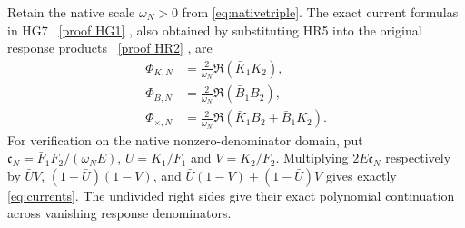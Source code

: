 \documentclass[11pt]{article}
\begin{document}
Retain the native scale $\omega_N>0$ from \eqref{eq:nativetriple}.
The exact current formulas in HG7 \cite{HG}%
~\href{https://github.com/KokunoYumeto/zeta-function-research-reader/blob/5992ad50c0f2a06921f1fcaded7b4e38097c0739/workbenches/splitzero-tandem/continuations/20260920-original-kernel-mixed-determinants/providers/HEAT_GROWTH_AND_ORIGINAL_CURRENTS.tex\#L31}{[proof HG1]}%
{}, also obtained by
substituting HR5 into the original response products \cite{HR}%
~\href{https://github.com/KokunoYumeto/zeta-function-research-reader/blob/5992ad50c0f2a06921f1fcaded7b4e38097c0739/workbenches/splitzero-tandem/continuations/20260920-original-kernel-mixed-determinants/providers/HEAT_OBSERVATION_RESPONSE_ERRORS.tex\#L32}{[proof HR2]}%
{}, are
\begin{equation}\label{eq:currents}
 \begin{aligned}
 \Phi_{K,N}&=\frac2{\omega_N}\Re(\bar K_1K_2),\\
 \Phi_{B,N}&=\frac2{\omega_N}\Re(\bar B_1B_2),\\
 \Phi_{\times,N}&=\frac2{\omega_N}
        \Re(\bar K_1B_2+\bar B_1K_2).
 \end{aligned}
\end{equation}
For verification on the native nonzero-denominator domain, put
$\mathfrak c_N=\bar F_1F_2/(\omega_NE)$, $U=K_1/F_1$ and
$V=K_2/F_2$.  Multiplying $2E\mathfrak c_N$ respectively by
$\bar UV$, $(1-\bar U)(1-V)$, and
$\bar U(1-V)+(1-\bar U)V$ gives exactly
\eqref{eq:currents}.  The undivided right sides give their exact
polynomial continuation across vanishing response denominators.
\end{document}
